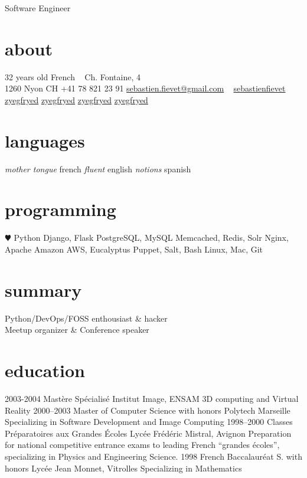 \documentclass[]{friggeri}
\begin{document}
       {Software Engineer}

\begin{aside}
  \section{about}
    {\FA \faUser} 32 years old
    {\FA \faFlag} French
    ~
    {\FA \faHome} Ch. Fontaine, 4\\1260 Nyon CH
    {\FA \faPhone} +41 78 821 23 91
    {\FA \faEnvelope} \href{mailto:sebastien.fievet@gmail.com}{sebastien.fievet@gmail.com}
    ~
    \href{http://www.linkedin.com/in/sebastienfievet}{{\FA \faLinkedin} sebastienfievet}
    ~
    \href{https://twitter.com/zyegfryed}{{\FA \faTwitter} zyegfryed}
    \href{https://github.com/zyegfryed}{{\FA \faGithub} zyegfryed}
    \href{https://bitbucket.org/zyegfryed}{{\FA \faBeaker} zyegfryed}
    \href{https://speakerdeck.com/zyegfryed}{{\FA \faBullhorn} zyegfryed}
  \section{languages}
    \emph{mother tongue} french
    \emph{fluent} english
    \emph{notions} spanish
  \section{programming}
    {\color{red} $\varheartsuit$} Python
    Django, Flask
    PostgreSQL, MySQL
    Memcached, Redis, Solr
    Nginx, Apache
    Amazon AWS, Eucalyptus
    Puppet, Salt, Bash
    Linux, Mac, Git
\end{aside}

\section{summary}

Python/DevOps/FOSS enthousiast \& hacker\\
Meetup organizer \& Conference speaker

\section{education}

\begin{entrylist}
  \entry
    {2003-2004}
    {Mastère Spécialisé}
    {Institut Image, ENSAM}
    {3D computing and Virtual Reality}
  \entry
    {2000–2003}
    {Master of Computer Science with honors}
    {Polytech Marseille}
    {Specializing in Software Development and Image Computing}
  \entry
    {1998–2000}
    {Classes Préparatoires aux Grandes Écoles}
    {Lycée Frédéric Mistral, Avignon}
    {Preparation for national competitive entrance exams to leading French ``grandes écoles'', specializing in Physics and Engineering Science.}
  \entry
    {1998}
    {French Baccalauréat S. with honors}
    {Lycée Jean Monnet, Vitrolles}
    {Specializing in Mathematics}
\end{entrylist}
\end{document}
